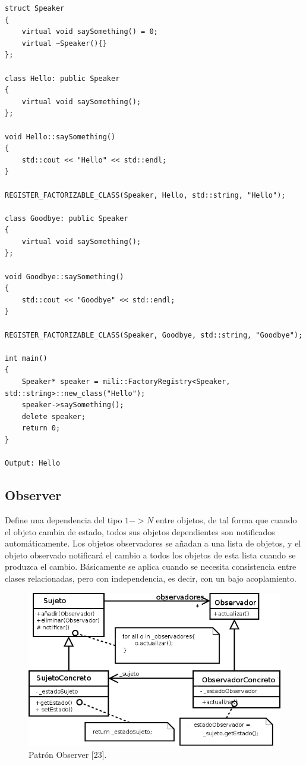 \begin{verbatim}
struct Speaker
{
    virtual void saySomething() = 0;
    virtual ~Speaker(){}
};

class Hello: public Speaker
{
    virtual void saySomething();
};

void Hello::saySomething()
{
    std::cout << "Hello" << std::endl;
}

REGISTER_FACTORIZABLE_CLASS(Speaker, Hello, std::string, "Hello");

class Goodbye: public Speaker
{
    virtual void saySomething();
};

void Goodbye::saySomething()
{
    std::cout << "Goodbye" << std::endl;
}

REGISTER_FACTORIZABLE_CLASS(Speaker, Goodbye, std::string, "Goodbye");

int main()
{
	Speaker* speaker = mili::FactoryRegistry<Speaker, std::string>::new_class("Hello");
	speaker->saySomething();
	delete speaker;
	return 0;
}

Output: Hello
\end{verbatim}

\subsection{Observer}
\label{observer}
Define una dependencia del tipo $1->N$ entre objetos, de tal forma que cuando el objeto cambia de estado, todos sus objetos dependientes son notificados automáticamente. Los objetos observadores se añadan a una lista de objetos, y el objeto observado notificará el cambio a todos los objetos de esta lista cuando se produzca el cambio. Básicamente se aplica cuando se necesita consistencia entre clases relacionadas, pero con independencia, es decir, con un bajo acoplamiento. 

\begin{figure}[h!]
	\centering
		\includegraphics[scale=0.4]{image/observer.png}
	\caption{Patrón Observer [23].}
\end{figure} 	

